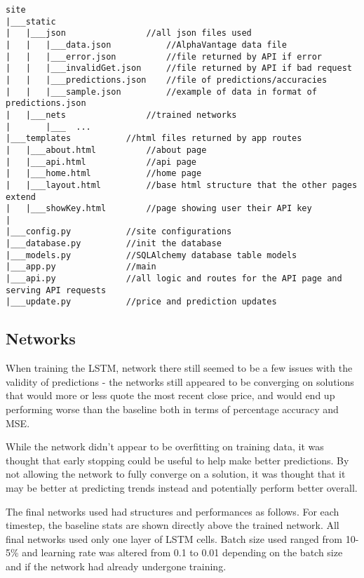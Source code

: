         \begin{verbatim}
site
|___static 
|   |___json                //all json files used
|   |   |___data.json           //AlphaVantage data file
|   |   |___error.json          //file returned by API if error
|   |   |___invalidGet.json     //file returned by API if bad request
|   |   |___predictions.json    //file of predictions/accuracies
|   |   |___sample.json         //example of data in format of predictions.json
|   |___nets                //trained networks
|       |___  ...
|___templates           //html files returned by app routes
|   |___about.html          //about page
|   |___api.html            //api page
|   |___home.html           //home page
|   |___layout.html         //base html structure that the other pages extend
|   |___showKey.html        //page showing user their API key
|
|___config.py           //site configurations 
|___database.py         //init the database
|___models.py           //SQLAlchemy database table models
|___app.py              //main 
|___api.py              //all logic and routes for the API page and serving API requests
|___update.py           //price and prediction updates
        \end{verbatim}

        \subsection{Networks}
        
        When training the LSTM, network there still seemed to be a few issues with the validity of predictions - the networks still appeared to be converging on solutions that would more or less quote the most recent close price, and would end up performing worse than the baseline both in terms of percentage accuracy and MSE. 

        While the network didn't appear to be overfitting on training data, it was thought that early stopping could be useful to help make better predictions. By not allowing the network to fully converge on a solution, it was thought that it may be better at predicting trends instead and potentially perform better overall.

        The final networks used had structures and performances as follows. For each timestep, the baseline stats are shown directly above the trained network. All final networks used only one layer of LSTM cells. Batch size used ranged from 10-5\% and learning rate was altered from 0.1 to 0.01 depending on the batch size and if the network had already undergone training.

